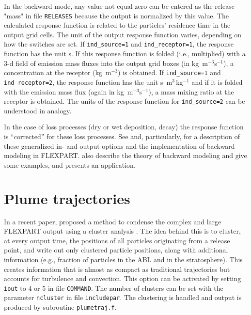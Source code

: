 \documentclass{egu}            %
\begin{document}
In the backward mode, any value not equal zero can be entered as the release
"mass" in file \verb|RELEASES| because the output is normalized by this value.
The calculated response function is related to the particles' residence time in
the output grid cells.  The unit of the output response function varies,
depending on how the switches are set.  If \verb|ind_source=1| and
\verb|ind_receptor=1|, the response function has the unit s.  If this response
function is folded (i.e., multiplied) with a 3-d field of emission mass fluxes
into the output grid boxes (in kg~m$^{-3}$s$^{-1}$), a concentration at the
receptor (kg~m$^{-3}$) is obtained.  If \verb|ind_source=1| and
\verb|ind_receptor=2|, the response function has the unit s~m$^3\,$kg$^{-1}$
and if it is folded with the emission mass flux (again in kg~m$^{-3}$s$^{-1}$),
a mass mixing ratio at the receptor is obtained.  The units of the response
function for \verb|ind_source=2| can be understood in analogy.

In the case of loss processes (dry or wet deposition, decay) the response
function is ``corrected'' for these loss processes.  See \citet{seibert2001}
and, particularly, \citet{seibert2004} for a description of these generalized
in- and output options and the implementation of backward modeling in FLEXPART.
\citet{seibert2004} also describe the theory of backward modeling and give some
examples, and \citet{stohl2003} presents an application.

\section{\label{plumetraj}Plume trajectories}

In a recent paper, \citet{stohl2002} proposed a method to condense the complex
and large FLEXPART output using a cluster analysis \citep{dorling1992}.  The
idea behind this is to cluster, at every output time, the positions of all
particles originating from a release point, and write out only clustered
particle positions, along with additional information (e.g., fraction of
particles in the ABL and in the stratosphere).  This creates information that
is almost as compact as traditional trajectories but accounts for turbulence
and convection.  This option can be activated by setting \verb|iout| to 4 or 5
in file \verb|COMMAND|.  The number of clusters can be set with the parameter
\verb|ncluster| in file \verb|includepar|.  The clustering is handled and
output is produced by subroutine \verb|plumetraj.f|.
\end{document}
